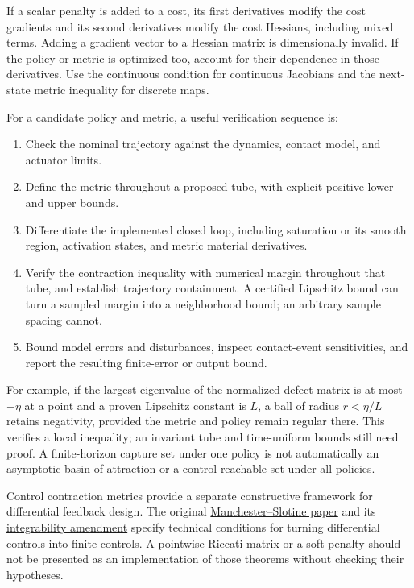 \documentclass[
  10pt,
  letterpaper,
  DIV=11,
  numbers=noendperiod]{scrartcl}
\providecommand{\tightlist}{%
  \setlength{\itemsep}{0pt}\setlength{\parskip}{0pt}}
\begin{document}
If a scalar penalty is added to a cost, its first derivatives modify the
cost gradients and its second derivatives modify the cost Hessians,
including mixed terms. Adding a gradient vector to a Hessian matrix is
dimensionally invalid. If the policy or metric is optimized too, account
for their dependence in those derivatives. Use the continuous condition
for continuous Jacobians and the next-state metric inequality for
discrete maps.

For a candidate policy and metric, a useful verification sequence is:

\begin{enumerate}
\def\labelenumi{\arabic{enumi}.}
\tightlist
\item
  Check the nominal trajectory against the dynamics, contact model, and
  actuator limits.
\item
  Define the metric throughout a proposed tube, with explicit positive
  lower and upper bounds.
\item
  Differentiate the implemented closed loop, including saturation or its
  smooth region, activation states, and metric material derivatives.
\item
  Verify the contraction inequality with numerical margin throughout
  that tube, and establish trajectory containment. A certified Lipschitz
  bound can turn a sampled margin into a neighborhood bound; an
  arbitrary sample spacing cannot.
\item
  Bound model errors and disturbances, inspect contact-event
  sensitivities, and report the resulting finite-error or output bound.
\end{enumerate}

For example, if the largest eigenvalue of the normalized defect matrix
is at most \(-\eta\) at a point and a proven Lipschitz constant is
\(L\), a ball of radius \(r<\eta/L\) retains negativity, provided the
metric and policy remain regular there. This verifies a local
inequality; an invariant tube and time-uniform bounds still need proof.
A finite-horizon capture set under one policy is not automatically an
asymptotic basin of attraction or a control-reachable set under all
policies.

Control contraction metrics provide a separate constructive framework
for differential feedback design. The original
\href{https://arxiv.org/abs/1503.03144}{Manchester--Slotine paper} and
its \href{https://arxiv.org/abs/1711.08128}{integrability amendment}
specify technical conditions for turning differential controls into
finite controls. A pointwise Riccati matrix or a soft penalty should not
be presented as an implementation of those theorems without checking
their hypotheses.
\end{document}
